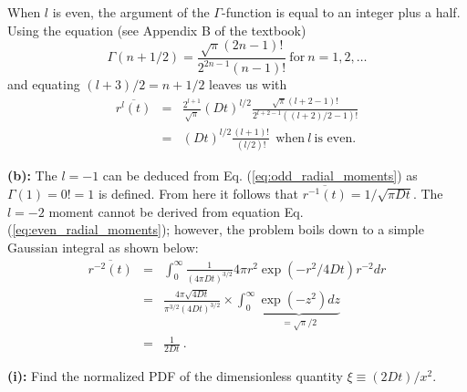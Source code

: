 When $l$ is even, the argument of the $\Gamma$-function is equal to an integer plus a half. Using the equation (see Appendix B of the textbook)
\begin{equation}
\Gamma(n+1/2) = \frac{\sqrt{\pi} (2n-1)!}{2^{2n-1}(n-1)!}~\text{for}~n = 1, 2, \ldots \nonumber
\end{equation}
and equating $(l+3)/2 = n + 1/2$ leaves us with
\begin{eqnarray}
\overline{r^l(t)} &=& \frac{2^{l+1}}{\sqrt{\pi}} (D t)^{l/2} \frac{\sqrt{\pi} (l+2-1)!}{2^{l+2-1}((l+2)/2-1)!} \nonumber \\
&=& \boxed{(D t)^{l/2} \frac{(l+1)!}{(l/2)!} ~~\text{when}~l~\text{is even.}} \label{eq:even_radial_moments}
\end{eqnarray}

\textbf{(b):} The $l=-1$ can be deduced from Eq. (\ref{eq:odd_radial_moments}) as $\Gamma(1) = 0! = 1$ is defined. From here it follows that $\overline{r^{-1}(t)} = 1/\sqrt{\pi Dt}$. The $l=-2$ moment cannot be derived from equation Eq. (\ref{eq:even_radial_moments}); however, the problem boils down to a simple Gaussian integral as shown below:
\begin{eqnarray}
\overline{r^{-2}(t)} &=& \int_{0}^{\infty} \frac{1}{(4 \pi D t)^{3/2}} 4 \pi r^2 \exp(-r^2/4Dt) r^{-2} dr \nonumber \\
&=& \frac{4 \pi \sqrt{4Dt}}{\pi^{3/2} (4Dt)^{3/2}} \times \int_{0}^{\infty} \underbrace{\exp(-z^2) dz}_{=\sqrt{\pi}/2} \nonumber \\
&=& \boxed{\frac{1}{2Dt}}~.
\end{eqnarray}


\textbf{(i):} Find the normalized PDF of the dimensionless quantity $\xi \equiv (2Dt)/x^2$. 

